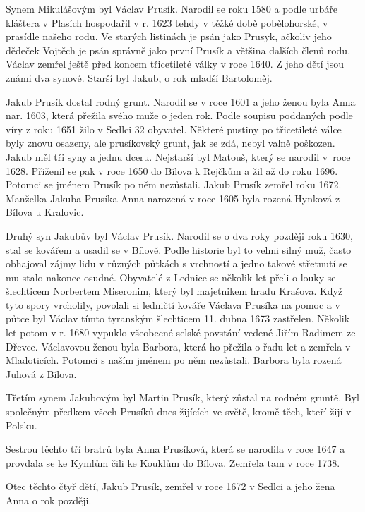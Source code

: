 \documentclass[../dejiny-rodu-prusiku.tex]{subfiles}
\begin{document}

Synem Mikulášovým byl Václav Prusík. Narodil se roku 1580 a podle urbáře kláštera v Plasích hospodařil v r. 1623 tehdy v těžké době pobělohorské, v prasídle našeho rodu. Ve starých listinách je psán jako Prusyk, ačkoliv jeho dědeček Vojtěch je psán správně jako první Prusík a většina dalších členů rodu. Václav zemřel ještě před koncem třicetileté války v roce 1640. Z jeho dětí jsou známi dva synové. Starší byl Jakub, o rok mladší Bartoloměj.

Jakub Prusík dostal rodný grunt. Narodil se v roce 1601 a jeho ženou byla Anna nar. 1603, která přežila svého muže o jeden rok. Podle soupisu poddaných podle víry z roku 1651 žilo v Sedlci 32 obyvatel. Některé pustiny po třicetileté válce byly znovu osazeny, ale prusíkovský grunt, jak se zdá, nebyl valně poškozen. Jakub měl tři syny a jednu dceru. Nejstarší byl Matouš, který se na­rodil v~roce 1628. Přiženil se pak v roce 1650 do Bílova k Rejčkům a žil až do roku 1696. Potomci se jménem Prusík po něm nezůstali. Jakub Prusík zemřel roku 1672. Manželka Jakuba Prusíka Anna narozená v roce 1605 byla rozená Hynková z Bílova u Kralovic.

Druhý syn Jakubův byl Václav Prusík. Narodil se o dva roky později roku 1630, stal se kovářem a usa­dil se v Bílově. Podle historie byl to velmi silný muž, často obhajoval zájmy lidu v různých půtkách s vrchností a jedno takové střetnutí se mu stalo nakonec osudné. Obyvatelé z Lednice se několik let přeli o louky se šlech­ticem Norbertem Miseronim, který byl majetnikem hradu Krašova. Když tyto spory vrcholily, povolali si lednič­tí kováře Václava Prusíka na pomoc a v půtce byl Václav tímto tyranským šlechticem 11. dubna 1673 zastřelen. Ně­kolik let potom v r. 1680 vypuklo všeobecné selské povstá­ní vedené Jiřím Radimem ze Dřevce. Václavovou ženou byla Barbora, která ho přežila o řadu let a zemřela v Mladoticích. Potomci s naším jménem po něm nezůstali. Barbora byla rozená Juhová z Bílova.

Třetím synem Jakubovým byl Martin Prusík, který zůstal na rodném gruntě. Byl společným předkem všech Prusíků dnes žijících ve světě, kromě těch, kteří žijí v Polsku.

Sestrou těchto tří bratrů byla Anna Prusíková, která se narodila v roce 1647 a provdala se ke Kymlům čili ke Kouklům do Bílova. Zemřela tam v roce 1738.

Otec těchto čtyř dětí, Jakub Prusík, zemřel v roce 1672 v Sedlci a jeho žena Anna o rok později.
\end{document}
